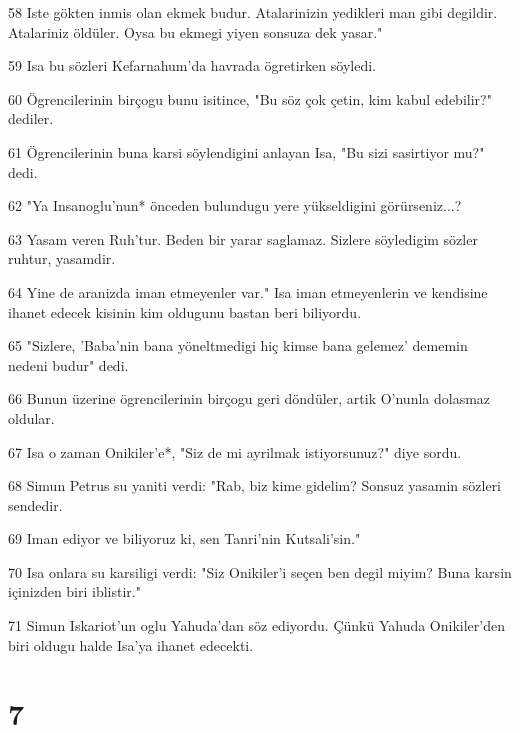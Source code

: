 \par 58 Iste gökten inmis olan ekmek budur. Atalarinizin yedikleri man gibi degildir. Atalariniz öldüler. Oysa bu ekmegi yiyen sonsuza dek yasar."
\par 59 Isa bu sözleri Kefarnahum'da havrada ögretirken söyledi.
\par 60 Ögrencilerinin birçogu bunu isitince, "Bu söz çok çetin, kim kabul edebilir?" dediler.
\par 61 Ögrencilerinin buna karsi söylendigini anlayan Isa, "Bu sizi sasirtiyor mu?" dedi.
\par 62 "Ya Insanoglu'nun* önceden bulundugu yere yükseldigini görürseniz...?
\par 63 Yasam veren Ruh'tur. Beden bir yarar saglamaz. Sizlere söyledigim sözler ruhtur, yasamdir.
\par 64 Yine de aranizda iman etmeyenler var." Isa iman etmeyenlerin ve kendisine ihanet edecek kisinin kim oldugunu bastan beri biliyordu.
\par 65 "Sizlere, 'Baba'nin bana yöneltmedigi hiç kimse bana gelemez' dememin nedeni budur" dedi.
\par 66 Bunun üzerine ögrencilerinin birçogu geri döndüler, artik O'nunla dolasmaz oldular.
\par 67 Isa o zaman Onikiler'e*, "Siz de mi ayrilmak istiyorsunuz?" diye sordu.
\par 68 Simun Petrus su yaniti verdi: "Rab, biz kime gidelim? Sonsuz yasamin sözleri sendedir.
\par 69 Iman ediyor ve biliyoruz ki, sen Tanri'nin Kutsali'sin."
\par 70 Isa onlara su karsiligi verdi: "Siz Onikiler'i seçen ben degil miyim? Buna karsin içinizden biri iblistir."
\par 71 Simun Iskariot'un oglu Yahuda'dan söz ediyordu. Çünkü Yahuda Onikiler'den biri oldugu halde Isa'ya ihanet edecekti.

\chapter{7}

